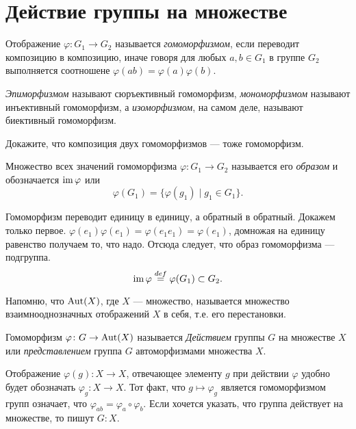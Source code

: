 \section{Действие группы на множестве}
\begin{definition}
    Отображение $\varphi\colon G_1 \to G_2$ называется \emph{гомоморфизмом}, если переводит композицию в композицию, иначе говоря для любых $a,b \in G_1$ в группе $G_2$ выполняется соотношене \(\varphi(ab) = \varphi(a)\varphi(b)\).

    \emph{Эпиморфизмом} называют сюръективный гомоморфизм, \emph{мономорфизмом} называют инъективный гомоморфизм, а \emph{изоморфизмом}, на самом деле, называют биективный гомоморфизм.
\end{definition}

\begin{practice}
    Докажите, что композиция двух гомоморфизмов --- тоже гомоморфизм.
\end{practice}

\begin{definition}
    Множество всех значений гомоморфизма $\varphi \colon G_1 \to G_2$ называется его \emph{образом} и обозначается $\operatorname{im} \varphi$ или $$\varphi (G_1) = \{\varphi(g_1)\mid g_1 \in G_1\}.$$
\end{definition}

Гомоморфизм переводит единицу в единицу, а обратный в обратный. Докажем только первое. \(\varphi(e_1)\varphi(e_1) = \varphi(e_1e_1)=\varphi(e_1)\), домножая на единицу равенство получаем то, что надо. Отсюда следует, что образ гомоморфизма --- подгруппа. \[\operatorname{im} \varphi \overset{def}{=} \varphi(G_1) \subset G_2.\]

Напомню, что $\operatorname{Aut}(X)$, где $X$ --- множество, называется множество взаимнооднозначных отображений $X$ в себя, т.е. его перестановки.

\begin{definition}
Гомоморфизм $\varphi\colon G \to \operatorname{Aut}(X)$ называется \emph{Действием} группы $G$ на множестве $X$ или \emph{представлением} группа $G$ автоморфизмами множества $X$. 

Отображение $\varphi(g) \colon X \to X$, отвечающее элементу $g$ при действии $\varphi$ удобно будет обозначать $\varphi_g \colon X \to X$. Тот факт, что $g \mapsto \varphi_g$ является гомоморфизмом групп означает, что $\varphi_{ab} = \varphi_a \circ \varphi_b$. Если хочется указать, что группа действует на множестве, то пишут $G \colon X$.
\end{definition}

